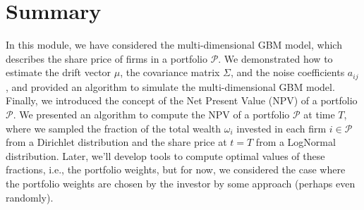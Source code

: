 \documentclass[11pt]{article}
\theoremstyle{definition}
\begin{document}
\section*{Summary}
In this module, we have considered the multi-dimensional GBM model, 
which describes the share price of firms in a portfolio $\mathcal{P}$.
We demonstrated how to estimate the drift vector $\mu$, the covariance matrix $\Sigma$, and the noise coefficients $a_{ij}$, and provided an algorithm to simulate the multi-dimensional GBM model. Finally, we introduced the concept of the Net Present Value (NPV) of a portfolio $\mathcal{P}$. We presented an algorithm to compute the NPV of a portfolio $\mathcal{P}$ at time $T$, 
where we sampled the fraction of the total wealth $\omega_{i}$ invested in each firm $i\in\mathcal{P}$ from a Dirichlet distribution and the share price at $t=T$ from a LogNormal distribution. Later, we'll develop tools to compute optimal values of these fractions, i.e., the portfolio weights, but for now, we considered the case where the portfolio weights are chosen by the investor by some approach (perhaps even randomly).



\clearpage
\printindex
\end{document}
